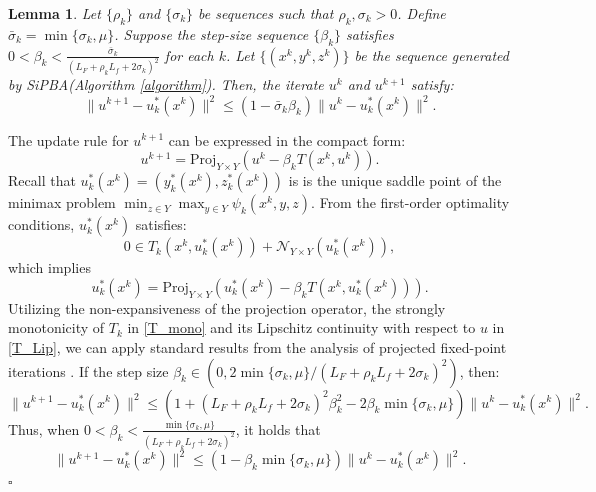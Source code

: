\documentclass{article}
\newtheorem{lemma}[theorem]{Lemma}
\newenvironment{proof}[1][Proof]{\par
	\normalfont\topsep6pt\relax
	\trivlist\item[\hskip\labelsep\itshape #1.]\ignorespaces
}{%
	\hfill\ensuremath{\square}\endtrivlist
}
\begin{document}
    \begin{lemma}\label{udescent}
    Let $\{\rho_k\}$ and $\{\sigma_k\}$ be sequences such that  $ \rho_{k}, \sigma_{k} >0$. Define $\bar{\sigma}_k = \min\{\sigma_k, \mu\}$. Suppose the step-size sequence $\{\beta_k\}$ satisfies $0<\beta_k<\frac{\bar{\sigma}_k}{(L_F + \rho_k L_f + 2\sigma_k)^2}$ for each $k$. Let $\{(x^k, y^k, z^k)\}$ be the sequence generated by SiPBA(Algorithm \ref{algorithm}). Then, the iterate $u^k$ and $u^{k+1}$ satisfy:
	 	\begin{equation}\label{udescentequ}
	 		\|u^{k+1}- u_k^*(x^k)\|^2\le(1-\bar{\sigma}_k \beta_k)\|u^{k}-u_k^*(x^k)\|^2.
	 	\end{equation}
    \end{lemma}
    \begin{proof}
    The update rule for $u^{k+1}$ can be expressed in the compact form:
    \[
    u^{k+1} = \mathrm{Proj}_{Y \times Y} \left( u^k - \beta_k T(x^k, u^k) \right).
    \]
Recall that  $u^*_k(x^k) = (y_{k}^*(x^k), z_{k}^*(x^k))$ is is the unique saddle point of the minimax problem $\min_{z \in {Y}} \max_{ y \in {Y}}\psi_{k}(x^k, y, z)$. From the first-order optimality conditions, $u^*_k(x^k)$ satisfies:
\[
    0 \in T_k(x^k,u^*_k(x^k)) + \mathcal{N}_{Y \times Y}(u^*_k(x^k)),
\]
which implies
\[
    u^*_k(x^k) = \mathrm{Proj}_{Y\times Y} \left( u^*_k(x^k) - \beta_k T(x^k, u^*_k(x^k)) \right).
\]
Utilizing the non-expansiveness of the projection operator, the strongly monotonicity of $T_k$ in \eqref{T_mono} and its Lipschitz continuity with respect to $u$ in \eqref{T_Lip}, we can apply standard results from the analysis of projected fixed-point iterations \cite[Theorem 12.1.2]{facchinei2003finite}. If the step size $\beta_k \in (0, 2\min\{\sigma_k, \mu\}/\left(L_F + \rho_k L_f + 2\sigma_k \right)^2 )$, then:
\[
    \|u^{k+1}- u^*_k(x^k) \|^2 \le (1+ (L_F + \rho_k L_f + 2\sigma_k)^2\beta_k^2 - 2\beta_k \min\{\sigma_k, \mu\} ) \|u^{k}- u^*_k(x^k) \|^2.
\]
Thus, when $0 < \beta_k < \frac{\min\{\sigma_k, \mu\}}{(L_F + \rho_k L_f + 2\sigma_k)^2 }$, it holds that
\[
    \|u^{k+1}- u^*_k(x^k) \|^2 \le (1 - \beta_k \min\{\sigma_k, \mu\} ) \|u^{k}- u^*_k(x^k) \|^2.
\]
    \end{proof}    
\end{document}
